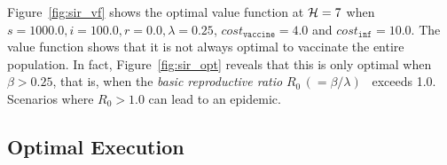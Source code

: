 Figure~\ref{fig:sir_vf} shows the optimal value function at {\footnotesize$ \mathcal{H} = 7 $} when {\footnotesize $ s = 1000.0, i = 100.0, r = 0.0, \lambda = 0.25 $}, {\footnotesize $ cost_{\mathtt{vaccine}} = 4.0$} and {\footnotesize $ cost_{\mathtt{inf}} = 10.0 $}. The value function shows that it is not always optimal to vaccinate the entire population. In fact, 
Figure~\ref{fig:sir_opt} reveals that 
this is only optimal when {\footnotesize $ \beta > 0.25 $}, that is, when the \textit{basic reproductive ratio} {\footnotesize $ R_0 \,(= \beta/\lambda)$}~\parencite{Heffernan_2005} exceeds 1.0. 
Scenarios where {\footnotesize $R_0 > 1.0$} can lead to an epidemic. 

\subsection{Optimal Execution}
\label{sec:results_oe}

